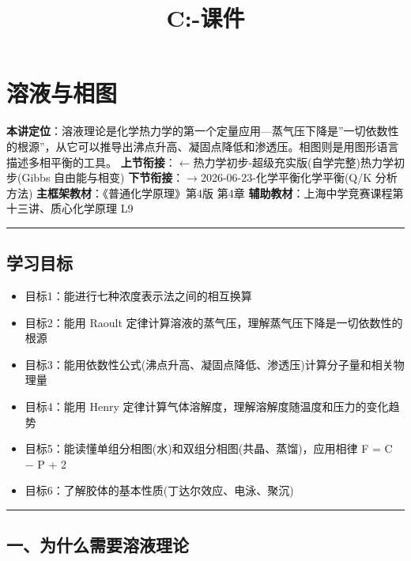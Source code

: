 \documentclass[a4paper,11pt]{ctexart}
\title{C:\Obsidion\妙妙屋\04-课件\学生讲义\溶液与相图}
\date{}
\providecommand{\tightlist}{\setlength{\itemsep}{0pt}\setlength{\parskip}{0pt}}
\newcommand{\箭}{\ensuremath{\rightarrow}}
\newcommand{\左箭}{\ensuremath{\leftarrow}}
\newcommand{\上箭}{\ensuremath{\uparrow}}
\newcommand{\下箭}{\ensuremath{\downarrow}}
\newcommand{\衡}{\ensuremath{\rightleftharpoons}}
\newcommand{\双箭}{\ensuremath{\leftrightarrow}}
\newcommand{\约等于}{\ensuremath{\approx}}
\newcommand{\小于等于}{\ensuremath{\leq}}
\newcommand{\大于等于}{\ensuremath{\geq}}
\newcommand{\不等于}{\ensuremath{\neq}}
\newcommand{\西格马}{\ensuremath{\sigma}}
\newcommand{\派}{\ensuremath{\pi}}
\begin{document}
\maketitle
\tableofcontents
\newpage
\section{溶液与相图}\label{ux6eb6ux6db2ux4e0eux76f8ux56fe}

\textbf{本讲定位}：溶液理论是化学热力学的第一个定量应用---蒸气压下降是''一切依数性的根源''，从它可以推导出沸点升高、凝固点降低和渗透压。相图则是用图形语言描述多相平衡的工具。
\textbf{上节衔接}：\左箭 热力学初步-超级充实版(自学完整)\textbar 热力学初步(Gibbs 自由能与相变)
\textbf{下节衔接}：\箭 2026-06-23-化学平衡\textbar 化学平衡(Q/K 分析方法)
\textbf{主框架教材}：《普通化学原理》第4版 第4章
\textbf{辅助教材}：上海中学竞赛课程第十三讲、质心化学原理 L9

\begin{center}\rule{0.5\linewidth}{0.5pt}\end{center}

\subsection{学习目标}\label{ux5b66ux4e60ux76eeux6807}

\begin{itemize}
\tightlist
\item
  目标1：能进行七种浓度表示法之间的相互换算
\item
  目标2：能用 Raoult 定律计算溶液的蒸气压，理解蒸气压下降是一切依数性的根源
\item
  目标3：能用依数性公式(沸点升高、凝固点降低、渗透压)计算分子量和相关物理量
\item
  目标4：能用 Henry 定律计算气体溶解度，理解溶解度随温度和压力的变化趋势
\item
  目标5：能读懂单组分相图(水)和双组分相图(共晶、蒸馏)，应用相律 F = C − P + 2
\item
  目标6：了解胶体的基本性质(丁达尔效应、电泳、聚沉)
\end{itemize}

\begin{center}\rule{0.5\linewidth}{0.5pt}\end{center}

\subsection{一、为什么需要溶液理论}\label{ux4e00ux4e3aux4ec0ux4e48ux9700ux8981ux6eb6ux6db2ux7406ux8bba}
\end{document}

